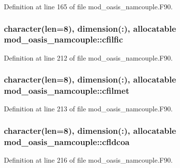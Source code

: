 Definition at line 165 of file mod\+\_\+oasis\+\_\+namcouple.\+F90.

\hypertarget{classmod__oasis__namcouple_a6a69d927924d3fa391fdc3ec6cb78197}{
\subsubsection[{cfilfic}]{\setlength{\rightskip}{0pt plus 5cm}character(len=8), dimension(\+:), allocatable mod\+\_\+oasis\+\_\+namcouple\+::cfilfic\hspace{0.3cm}{\ttfamily [private]}}}\label{classmod__oasis__namcouple_a6a69d927924d3fa391fdc3ec6cb78197}


Definition at line 212 of file mod\+\_\+oasis\+\_\+namcouple.\+F90.

\hypertarget{classmod__oasis__namcouple_adf402f22f61893178fadcefe43b91102}{
\subsubsection[{cfilmet}]{\setlength{\rightskip}{0pt plus 5cm}character(len=8), dimension(\+:), allocatable mod\+\_\+oasis\+\_\+namcouple\+::cfilmet\hspace{0.3cm}{\ttfamily [private]}}}\label{classmod__oasis__namcouple_adf402f22f61893178fadcefe43b91102}


Definition at line 213 of file mod\+\_\+oasis\+\_\+namcouple.\+F90.

\hypertarget{classmod__oasis__namcouple_af3a308fee2e4b00a1380035e41113d36}{
\subsubsection[{cfldcoa}]{\setlength{\rightskip}{0pt plus 5cm}character(len=8), dimension(\+:), allocatable mod\+\_\+oasis\+\_\+namcouple\+::cfldcoa\hspace{0.3cm}{\ttfamily [private]}}}\label{classmod__oasis__namcouple_af3a308fee2e4b00a1380035e41113d36}


Definition at line 216 of file mod\+\_\+oasis\+\_\+namcouple.\+F90.

